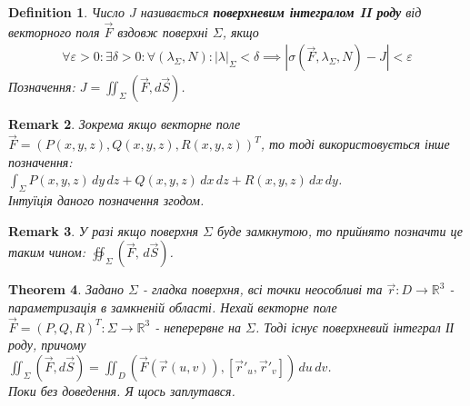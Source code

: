 \documentclass[a4paper, 10pt]{article}
\makeatletter
\def\qed{$\blacksquare$}
\theoremstyle{theoremdd}
\newtheorem{theorem}{Theorem}[subsection]
\theoremstyle{theoremdd}
\newtheorem{definition}[theorem]{Definition}
\theoremstyle{theoremdd}
\theoremstyle{theoremdd}
\theoremstyle{theoremdd}
\theoremstyle{theoremdd}
\newtheorem{remark}[theorem]{Remark}
\theoremstyle{theoremdd}
\theoremstyle{theoremdd}
\renewenvironment{proof}[1][Proof.\\]{\par
\pushQED{\hfill \qed}%
\normalfont \topsep6\p@\@plus6\p@\relax
\trivlist
\item\relax
{\bfseries
#1\@addpunct{.}}\hspace\labelsep\ignorespaces
}{%
\popQED\endtrivlist\@endpefalse
}
\newcommand\Norm[1]{\left\lVert#1\right\rVert}
\makeatother
\begin{document}
\begin{definition}
Число $J$ називається \textbf{поверхневим інтегралом II роду} від векторного поля $\vec{F}$ вздовж поверхні $\Sigma$, якщо
\begin{align*}
\forall \varepsilon > 0: \exists \delta > 0: \forall (\lambda_\Sigma, N): |\lambda|_\Sigma < \delta \implies |\sigma(\vec{F},\lambda_\Sigma, N) - J| < \varepsilon
\end{align*}
Позначення: $J = \displaystyle\iint_\Sigma (\vec{F}, d\vec{S})$.
\end{definition}

\begin{remark}
Зокрема якщо векторне поле $\vec{F} = ( P(x,y,z), Q(x,y,z), R(x,y,z) )^T$, то тоді використовується інше позначення:\\
$\displaystyle\int_\Sigma P(x,y,z)\,dy\,dz + Q(x,y,z)\,dx\,dz + R(x,y,z)\,dx\,dy$.\\
Інтуїція даного позначення згодом.
\end{remark}

\begin{remark}
У разі якщо поверхня $\Sigma$ буде замкнутою, то прийнято позначти це таким чином: $\displaystyle\oiint_{\Sigma} (\vec{F}, \,d\vec{S})$.
\end{remark}

\begin{theorem}
Задано $\Sigma$ - гладка поверхня, всі точки неособливі та $\vec{r}: D \to \mathbb{R}^3$ - параметризація в замкненій області. Нехай векторне поле $\vec{F} = (P,Q,R)^T: \Sigma \to \mathbb{R}^3$ - неперервне на $\Sigma$. Тоді існує поверхневий інтеграл ІІ роду, причому\\
$\displaystyle\iint_\Sigma (\vec{F},d\vec{S}) = \iint_D \left(\vec{F}(\vec{r}(u,v)), [\vec{r}'_u, \vec{r}'_v]\right)\,du\,dv$.\\
\textit{Поки без доведення. Я щось заплутався.}
\end{theorem}

\iffalse
\begin{proof}
Спочатку зауважимо, що $\vec{n} = \dfrac{[\vec{r}'_u, \vec{r}'_v]}{\Norm{[\vec{r}'_u, \vec{r}'_v]}}$. А також треба побачити, що $\overrightarrow{T^*_{N_i} \Sigma(v_1,v_2)} = \vec{n} \cdot S(T^*_{N_i} \Sigma(v_1,v_2))$. Але ось ця площа - це фактично площа паралелограму, а це ж є норма векторного добутку. Таким чином,\\
$(\vec{F},\overrightarrow{T^*_{N_i} \Sigma(v_1,v_2)}) = (\vec{F}, [\vec{r}'_u, \vec{r}'_v ])$
\end{proof}
\fi
\end{document}
